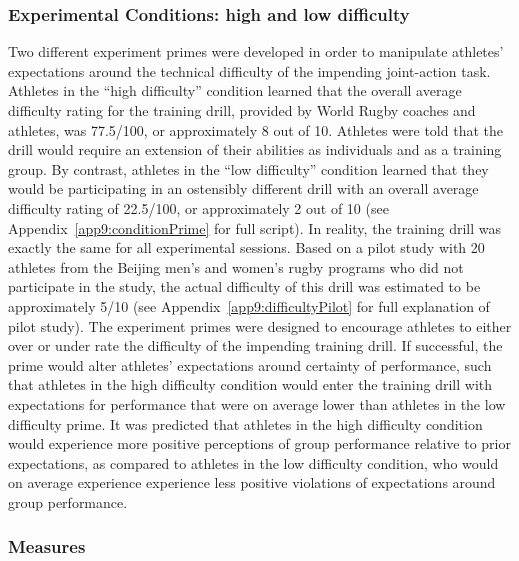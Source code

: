 \subsubsection{Experimental Conditions: high and low difficulty\label{sect:expPrimes}}
Two different experiment primes were developed in order to manipulate athletes’ expectations around the technical difficulty of the impending joint-action task.  Athletes in the ``high difficulty'' condition learned that the overall average difficulty rating for the training drill, provided by World Rugby coaches and athletes, was 77.5/100, or approximately 8 out of 10.  Athletes were told that the drill would require an extension of their abilities as individuals and as a training group.  By contrast, athletes in the ``low difficulty'' condition learned that they would be participating in an ostensibly different drill with an overall average difficulty rating of 22.5/100, or approximately 2 out of 10 (see Appendix~\ref{app9:conditionPrime} for full script).  In reality, the training drill was exactly the same for all experimental sessions.  Based on a pilot study with 20 athletes from the Beijing men's and women's rugby programs who did not participate in the study, the actual difficulty of this drill was estimated to be approximately 5/10 (see Appendix~\ref{app9:difficultyPilot} for full explanation of pilot study).  The experiment primes were designed to encourage athletes to either over or under rate the difficulty of the impending training drill. If successful, the prime would alter athletes' expectations around certainty of performance, such that athletes in the high difficulty condition would enter the training drill with expectations for performance that were on average lower than athletes in the low difficulty prime. It was predicted that athletes in the high difficulty condition would experience more positive perceptions of group performance relative to prior expectations, as compared to athletes in the low difficulty condition, who would on average experience experience less positive violations of expectations around group performance.


\subsubsection{Measures}


